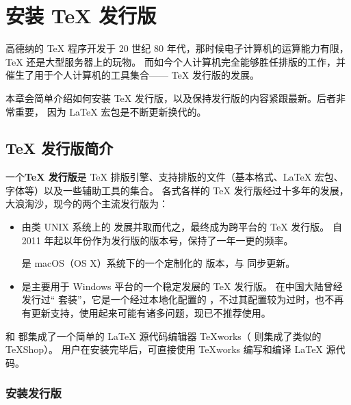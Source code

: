 \chapter{安装 \protect\TeX{} 发行版}\label{app:install}

\begin{intro}
高德纳的 \TeX{} 程序开发于 20 世纪 80 年代，那时候电子计算机的运算能力有限，\TeX{} 还是大型服务器上的玩物。
而如今个人计算机完全能够胜任排版的工作，并催生了用于个人计算机的工具集合—— \TeX{} 发行版的发展。

本章会简单介绍如何安装 \TeX{} 发行版，以及保持发行版的内容紧跟最新。后者非常重要，
因为 \LaTeX{} 宏包是不断更新换代的。
\end{intro}

\section{\protect\TeX{} 发行版简介}\label{sec:dists}

一个\textbf{\TeX{} 发行版}是 \TeX{} 排版引擎、支持排版的文件（基本格式、\LaTeX{} 宏包、字体等）以及一些辅助工具的集合。
各式各样的 \TeX{} 发行版经过十多年的发展，大浪淘沙，现今的两个主流发行版为：
\begin{itemize}
  \item \textbf{}\par
   由类 UNIX 系统上的  发展并取而代之，最终成为跨平台的 \TeX{} 发行版。
   自 2011 年起以年份作为发行版的版本号，保持了一年一更的频率。

   是 macOS（OS X）系统下的一个定制化的  版本，与  同步更新。

  \item \textbf{}\par
   是主要用于 Windows 平台的一个稳定发展的 \TeX{} 发行版。
  在中国大陆曾经发行过“ 套装”，它是一个经过本地化配置的 ，不过其配置较为过时，也不再有更新支持，使用起来可能有诸多问题，现已不推荐使用。
\end{itemize}

 和  都集成了一个简单的 \LaTeX{} 源代码编辑器 TeXworks（ 则集成了类似的 TeXShop）。
用户在安装完毕后，可直接使用 TeXworks 编写和编译 \LaTeX{} 源代码。

\subsection{安装发行版}\label{subsec:install-dists}

